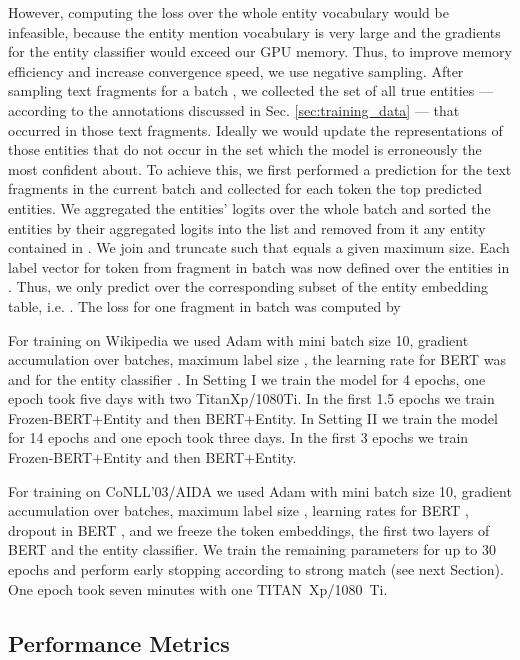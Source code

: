 \documentclass[11pt,a4paper]{article}
\begin{document}
\noindent However, computing the loss over the whole entity vocabulary would be infeasible, because the entity mention vocabulary is very large and the gradients for the entity classifier would exceed our GPU memory. Thus, to improve memory efficiency and increase convergence speed, we use negative sampling. After sampling text fragments for a batch , we collected the set  of all true entities ---according to the annotations discussed in Sec. \ref{sec:training_data} ---  that occurred in those text fragments. Ideally we would update the representations of those entities that do not occur in the set  which the model is erroneously the most confident about. To achieve this, we first performed a prediction for the text fragments in the current batch and collected for each token the top  predicted entities. We aggregated the entities' logits over the whole batch and sorted the entities by their aggregated logits into the list  and removed from it any entity contained in . We join  and truncate  such that  equals a given maximum size. Each label vector  for token  from fragment  in batch  was now defined over the entities in . Thus, we only predict over the corresponding subset of the entity embedding table, i.e.  . The loss for one fragment  in batch  was computed by 


For training on Wikipedia we used Adam \citep{DBLP:journals/corr/KingmaB14} with mini batch size 10, gradient accumulation over  batches, maximum label size , the learning rate for BERT was  and for the entity classifier . In Setting I we train the model for 4 epochs, one epoch took five days with two TitanXp/1080Ti. In the first 1.5 epochs we train Frozen-BERT+Entity and then BERT+Entity. In Setting II we train the model for 14 epochs and one epoch took three days. In the first 3 epochs we train Frozen-BERT+Entity and then BERT+Entity.  

For training on CoNLL’03/AIDA we used Adam \citep{DBLP:journals/corr/KingmaB14} with mini batch size 10, gradient accumulation over  batches, maximum label size , learning rates for BERT , dropout in BERT , and we freeze the token embeddings, the first two layers of BERT and the entity classifier. We train the remaining parameters for up to 30 epochs and perform early stopping according to strong match (see next Section). One epoch took seven minutes with one TITAN~Xp/1080~Ti. 




\subsection{Performance Metrics}
\end{document}
